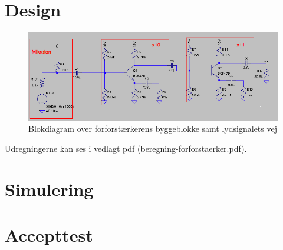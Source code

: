 \section{Design}

\begin{figure}[h]
\centering
\includegraphics[scale=.6]{teknisk/forforstaerker/blok_forforstaerker.png}
\caption{Blokdiagram over forforstærkerens byggeblokke samt lydsignalets vej}
\label{blok_forforstaerker}
\end{figure}

Udregningerne kan ses i vedlagt pdf (beregning-forforstaerker.pdf). 


\section{Simulering}


\section{Accepttest}

